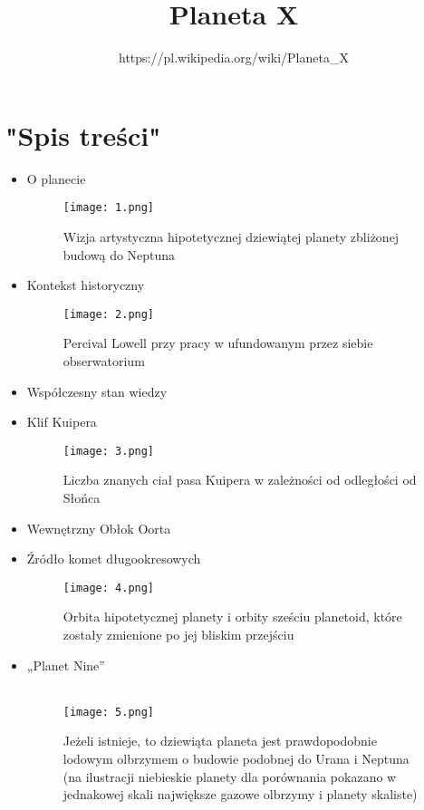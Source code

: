 \documentclass[12pt]{article}
\author{https://pl.wikipedia.org/wiki/Planeta{\_}X}
\title{\textsf{Planeta X}}
\begin{document}
\maketitle
\section{"Spis treści"}
\begin{itemize}
  \item O planecie \\
\begin{figure}[!ht]
\texttt{[image: 1.png]}\caption{Wizja artystyczna hipotetycznej dziewiątej planety zbliżonej budową do Neptuna}\label{fig:1}
\end{figure}
  \item Kontekst historyczny \\
\begin{figure}[!ht]
\texttt{[image: 2.png]}\caption{Percival Lowell przy pracy w ufundowanym przez siebie obserwatorium}\label{fig:2}
\end{figure}
  \item Współczesny stan wiedzy \\
  \item Klif Kuipera  \\
\begin{figure}[!ht]
\texttt{[image: 3.png]}\caption{Liczba znanych ciał pasa Kuipera w zależności od odległości od Słońca}\label{fig:3}
\end{figure}
  \item Wewnętrzny Obłok Oorta \\
  \item Źródło komet długookresowych  \\
\begin{figure}[!ht]
\texttt{[image: 4.png]}\caption{Orbita hipotetycznej planety i orbity sześciu planetoid, które zostały zmienione po jej bliskim przejściu}\label{fig:4}
\end{figure}
  \item „Planet Nine”  \\
\\
\begin{figure}[!ht]
\texttt{[image: 5.png]}\caption{Jeżeli istnieje, to dziewiąta planeta jest prawdopodobnie lodowym olbrzymem o budowie podobnej do Urana i Neptuna (na ilustracji niebieskie planety dla porównania pokazano w jednakowej skali największe gazowe olbrzymy i planety skaliste)}\label{fig:5}
\end{figure}
\end{itemize}
\newpage
\end{document}
